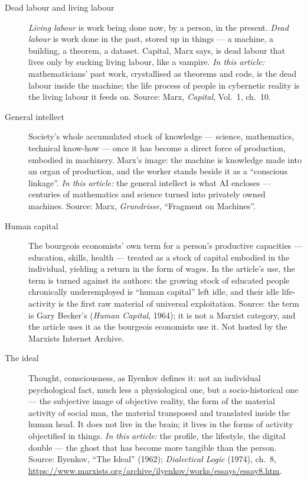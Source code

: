 \documentclass[11pt]{article}
\begin{document}
\begin{description}
\item[Dead labour and living labour] \emph{Living labour} is work being
done now, by a person, in the present. \emph{Dead labour} is work done
in the past, stored up in things --- a machine, a building, a theorem,
a dataset. Capital, Marx says, is dead labour that lives only by
sucking living labour, like a vampire. \emph{In this article:}
mathematicians' past work, crystallised as theorems and code, is the
dead labour inside the machine; the life process of people in
cybernetic reality is the living labour it feeds on. Source: Marx,
\emph{Capital}, Vol.~1, ch.~10.

\item[General intellect] Society's whole accumulated stock of knowledge
--- science, mathematics, technical know-how --- once it has become a
direct force of production, embodied in machinery. Marx's image: the
machine is knowledge made into an organ of production, and the worker
stands beside it as a ``conscious linkage''. \emph{In this article:}
the general intellect is what AI encloses --- centuries of mathematics
and science turned into privately owned machines. Source: Marx,
\emph{Grundrisse}, ``Fragment on Machines''.

\item[Human capital] The bourgeois economists' own term for a person's
productive capacities --- education, skills, health --- treated as a
stock of capital embodied in the individual, yielding a return in the
form of wages. In the article's use, the term is turned against its
authors: the growing stock of educated people chronically underemployed
is ``human capital'' left idle, and their idle life-activity is the
first raw material of universal exploitation. Source: the term is Gary
Becker's (\emph{Human Capital}, 1964); it is not a Marxist category,
and the article uses it as the bourgeois economists use it. Not hosted
by the Marxists Internet Archive.

\item[The ideal] Thought, consciousness, as Ilyenkov defines it: not an
individual psychological fact, much less a physiological one, but a
socio-historical one --- the subjective image of objective reality, the
form of the material activity of social man, the material transposed
and translated inside the human head. It does not live in the brain; it
lives in the forms of activity objectified in things. \emph{In this
article:} the profile, the lifestyle, the digital double --- the ghost
that has become more tangible than the person. Source: Ilyenkov, ``The
Ideal'' (1962); \textit{Dialectical Logic} (1974), ch.~8,
\url{https://www.marxists.org/archive/ilyenkov/works/essays/essay8.htm}.


\end{description}
\end{document}
